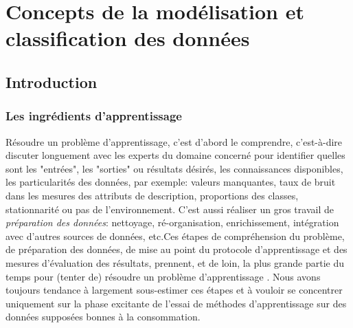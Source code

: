 	

		
%
%


	
	\pagebreak
\section{Concepts de la modélisation et classification des données}
	\subsection{Introduction}
	\subsubsection{Les ingrédients d'apprentissage}
		Résoudre un problème d'apprentissage, c'est d'abord le comprendre, c'est-à-dire discuter longuement avec les experts du domaine concerné pour identifier quelles sont les "entrées", les  "sorties" ou résultats désirés, les connaissances disponibles, les particularités des données, par exemple: valeurs manquantes, taux de bruit dans les mesures des attributs de description, proportions des classes, stationnarité ou pas de l'environnement. 
		C'est aussi réaliser un gros travail de \textit{préparation des données}: nettoyage, ré-organisation, enrichissement, intégration avec d'autres sources de données, etc.Ces étapes de compréhension du problème, de préparation des données, de mise au point du protocole d'apprentissage et des mesures d'évaluation des résultats, prennent, et de loin, la plus grande partie du temps pour (tenter de) résoudre un problème d'apprentissage \cite{antoine2018apprentissage}. 
		Nous avons toujours tendance à largement sous-estimer ces étapes et à vouloir se concentrer uniquement sur la phase excitante de l'essai de méthodes d'apprentissage sur des données supposées bonnes à la consommation. 
	
